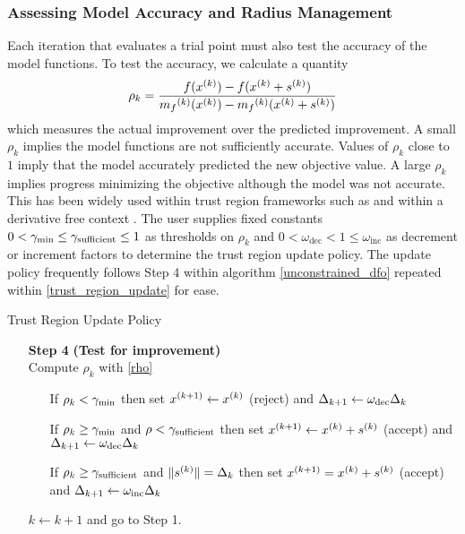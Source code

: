 \subsubsection{Assessing Model Accuracy and Radius Management}

Each iteration that evaluates a trial point must also test the accuracy of the model functions.
To test the accuracy, we calculate a quantity
\begin{equation}
\label{rho}
\rho_k = \frac{f({x^{(k)}}) - f({x^{(k)}}+{{s}^{(k)}})}{{{m}_f}^{(k)}({x^{(k)}}) - {{m}_f}^{(k)}({x^{(k)}}+{{s}^{(k)}})}
\end{equation}
which measures the actual improvement over the predicted improvement.
A small $\rho_k$ implies the model functions are not sufficiently accurate.
Values of $\rho_k$ close to $1$ imply that the model accurately predicted the new objective value.
A large $\rho_k$ implies progress minimizing the objective although the model was not accurate.
This has been widely used within trust region frameworks such as \cite{Conn:2000:TM:357813} and within a derivative free context \cite{DUMMY:intro_book}.
The user supplies fixed constants $0 < \gamma_{\text{min}} \le \gamma_{\text{sufficient}} \le 1$ as thresholds on $\rho_k$ and $0 < \omega_{\text{dec}} < 1 \le \omega_{\text{inc}}$ as decrement or increment factors to determine the trust region update policy.
The update policy frequently follows Step 4 within algorithm \cref{unconstrained_dfo} repeated within \cref{trust_region_update} for ease.

\begin{algorithm}[H]
    \caption{Trust Region Update Policy}
    \label{trust_region_update}
    \begin{itemize}
        \item[\textbf{Step 4}] \textbf{(Test for improvement)} \\
            Compute $\rho_k$ with \cref{rho} \begin{itemize}
                \item[] If $\rho_k < \gamma_{\text{min}}$ then set ${x}^{(k+1)} \gets {x^{(k)}}$ (reject) and $\Delta_{k+1} \gets \omega_{\text{dec}}\Delta_{k}$
                \item[] If $\rho_k \ge \gamma_{\text{min}}$ and $\rho < \gamma_{\text{sufficient}}$ then set ${x}^{(k+1)}\gets{x^{(k)}}+{{s}^{(k)}}$ (accept) and $\Delta_{k+1} \gets \omega_{\text{dec}}\Delta_{k}$
                \item[] If $\rho_k \ge \gamma_{\text{sufficient}}$ and $\|{{s}^{(k)}}\| = \Delta_{k}$ then set ${x}^{(k+1)}={x^{(k)}}+{{s}^{(k)}}$ (accept) and $\Delta_{k+1} \gets \omega_{\text{inc}}\Delta_{k}$
            \end{itemize}
            $k \gets k+1$ and go to Step 1.
    \end{itemize}
\end{algorithm}

